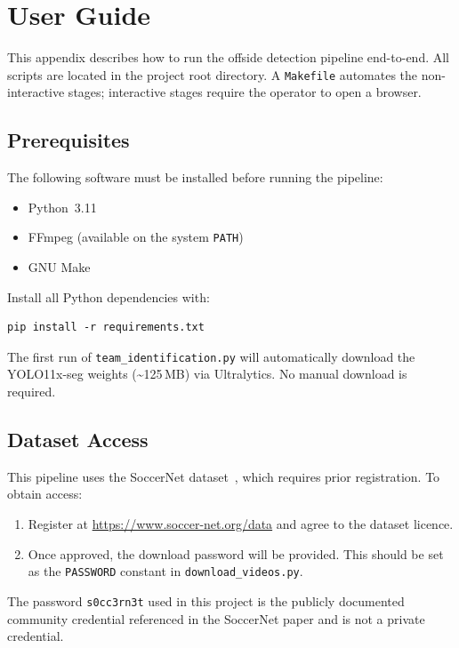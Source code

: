 \chapter{User Guide}%
\label{app:user_guide}

This appendix describes how to run the offside detection pipeline end-to-end. All scripts are located in the project root directory. A \texttt{Makefile} automates the non-interactive stages; interactive stages require the operator to open a browser.

\section*{Prerequisites}

The following software must be installed before running the pipeline:

\begin{itemize}
  \item Python~3.11
  \item FFmpeg (available on the system \texttt{PATH})
  \item GNU Make
\end{itemize}

Install all Python dependencies with:
\begin{verbatim}
pip install -r requirements.txt
\end{verbatim}

The first run of \texttt{team\_identification.py} will automatically download the
YOLO11x-seg weights (\textasciitilde125\,MB) via Ultralytics. No manual download is required.

\section*{Dataset Access}

This pipeline uses the SoccerNet dataset~\cite{giancola2018soccernet,deliegev2soccernet}, which requires
prior registration. To obtain access:

\begin{enumerate}
  \item Register at \url{https://www.soccer-net.org/data} and agree to the dataset licence.
  \item Once approved, the download password will be provided. This should be set as the
        \texttt{PASSWORD} constant in \texttt{download\_videos.py}.
\end{enumerate}

The password \texttt{s0cc3rn3t} used in this project is the publicly documented community
credential referenced in the SoccerNet paper and is not a private credential.

